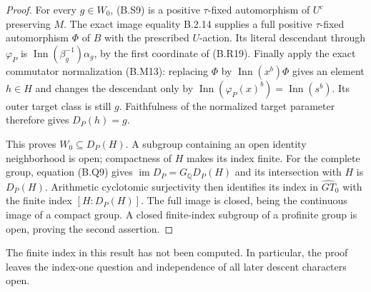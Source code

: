 \begin{proof}
For every $g\in W_0$, (B.S9) is a positive
$\tau$-fixed automorphism of $U^{\mathrm c}$ preserving
$M$.  The exact image equality B.2.14 supplies a full
positive $\tau$-fixed automorphism $\Phi$ of $B$ with
the prescribed $U$-action.  Its literal descendant
through $\varphi_P$ is
$\operatorname{Inn}(\beta_g^{-1})\alpha_g$, by the
first coordinate of (B.R19).  Finally apply the exact
commutator normalization (B.M13): replacing $\Phi$
by $\operatorname{Inn}(x^b)\Phi$ gives an element
$h\in H$ and changes the descendant only by
$\operatorname{Inn}(\varphi_P(x)^b)
=\operatorname{Inn}(s^b)$.  Its outer target class is
still $g$.  Faithfulness of the normalized target
parameter therefore gives $D_P(h)=g$.

This proves $W_0\subseteq D_P(H)$.  A subgroup
containing an open identity neighborhood is open;
compactness of $H$ makes its index finite.  For the
complete group, equation (B.Q9) gives
$\operatorname{im}D_P=G_{\mathbb Q}D_P(H)$ and its
intersection with $H$ is $D_P(H)$.  Arithmetic
cyclotomic surjectivity then identifies its index
in $\widehat{GT}_0$ with the finite index
$[H:D_P(H)]$.  The full image is closed, being the
continuous image of a compact group.  A closed
finite-index subgroup of a profinite group is open,
proving the second assertion.
\end{proof}

The finite index in this result has not been computed.
In particular, the proof leaves the index-one question
and independence of all later descent characters open.
